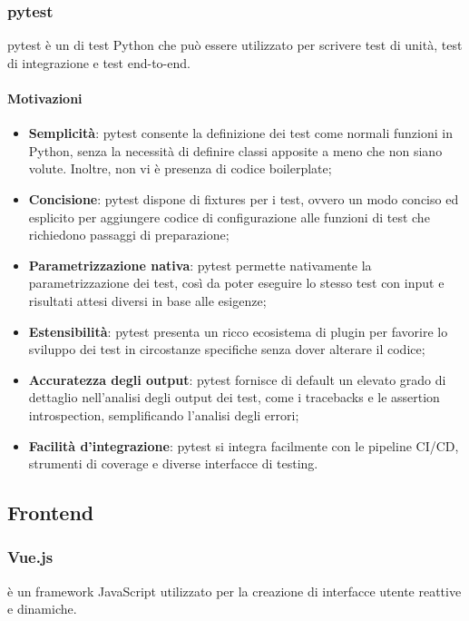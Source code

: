 \subsubsection{pytest}\label{sec:pytest}
\par pytest è un  di test Python che può essere utilizzato per scrivere test di unità, test di integrazione e test end-to-end.
\paragraph*{Motivazioni}
\begin{itemize}
  \item \textbf{Semplicità}: pytest consente la definizione dei test come normali funzioni in Python, senza la necessità di definire classi apposite a meno che non siano volute. Inoltre, non vi è presenza di codice boilerplate;
  \item \textbf{Concisione}: pytest dispone di fixtures per i test, ovvero un modo conciso ed esplicito per aggiungere codice di configurazione alle funzioni di test che richiedono passaggi di preparazione;
  \item \textbf{Parametrizzazione nativa}: pytest permette nativamente la parametrizzazione dei test, così da poter eseguire lo stesso test con input e risultati attesi diversi in base alle esigenze;
  \item \textbf{Estensibilità}: pytest presenta un ricco ecosistema di plugin per favorire lo sviluppo dei test in circostanze specifiche senza dover alterare il codice;
  \item \textbf{Accuratezza degli output}: pytest fornisce di default un elevato grado di dettaglio nell'analisi degli output dei test, come i tracebacks e le assertion introspection, semplificando l'analisi degli errori;
  \item \textbf{Facilità d'integrazione}: pytest si integra facilmente con le pipeline CI/CD, strumenti di coverage e diverse interfacce di testing.
\end{itemize}

\subsection{Frontend}\label{sec:tecnologie-frontend}

\subsubsection{Vue.js}\label{sec:vuejs}
\par {} è un framework JavaScript utilizzato per la creazione di interfacce utente reattive e dinamiche.
